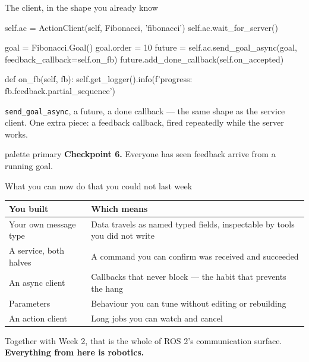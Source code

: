 \documentclass[aspectratio=169]{beamer}
\begin{document}
\begin{frame}[fragile]{The client, in the shape you already know}
  \begin{pycodes}
self.ac = ActionClient(self, Fibonacci, 'fibonacci')
self.ac.wait_for_server()

goal = Fibonacci.Goal()
goal.order = 10
future = self.ac.send_goal_async(goal, feedback_callback=self.on_fb)
future.add_done_callback(self.on_accepted)

def on_fb(self, fb):
    self.get_logger().info(f'progress: {fb.feedback.partial_sequence}')
  \end{pycodes}

  \vspace{0.3em}
  \footnotesize
  \texttt{send\_goal\_async}, a future, a done callback --- the same shape as the service
  client. One extra piece: a feedback callback, fired repeatedly while the server works.

  \vspace{0.2em}
  \centering
  \begin{beamercolorbox}[sep=5pt,center,rounded=true]{palette primary}
    \footnotesize \textbf{Checkpoint 6.} Everyone has seen feedback arrive from a running goal.
  \end{beamercolorbox}
\end{frame}

\begin{frame}{What you can now do that you could not last week}
  \small
  \begin{center}
  \begin{tabular}{@{}p{4.6cm}p{6.4cm}@{}}
    \toprule
    \textbf{You built} & \textbf{Which means} \\
    \midrule
    Your own message type & Data travels as named typed fields, inspectable by tools you did not write \\[0.3em]
    A service, both halves & A command you can confirm was received and succeeded \\[0.3em]
    An async client & Callbacks that never block --- the habit that prevents the hang \\[0.3em]
    Parameters & Behaviour you can tune without editing or rebuilding \\[0.3em]
    An action client & Long jobs you can watch and cancel \\
    \bottomrule
  \end{tabular}
  \end{center}

  \vspace{0.5em}
  \centering
  Together with Week 2, that is the whole of ROS 2's communication surface. \textbf{Everything
  from here is robotics.}
\end{frame}
\end{document}
